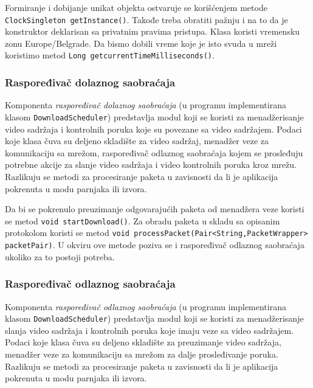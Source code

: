 \documentclass[12pt,oneside]{memoir}
\begin{document}
Formiranje i dobijanje unikat objekta ostvaruje se korišćenjem metode \\\texttt{ClockSingleton getInstance()}. 
Takođe treba obratiti pažnju i na to da je konstruktor deklarisan sa privatnim pravima pristupa. Klasa koristi vremensku zonu Europe/Belgrade. Da bismo dobili vreme koje je isto svuda u mreži koristimo metod \texttt{Long getcurrentTimeMilliseconds()}.


\subsubsection{Raspoređivač dolaznog saobraćaja}
\label{implementacija.2.3.5}

Komponenta \textit{raspoređivač dolaznog saobraćaja} (u programu implementirana klasom \texttt{DownloadScheduler}) predstavlja modul koji se koristi za menadžerisanje video sadržaja i kontrolnih poruka koje su povezane sa video sadržajem. Podaci koje klasa čuva su deljeno skladište za video sadržaj, menadžer veze za komunikaciju sa mrežom, raspoređivač odlaznog saobraćaja kojem se prosleđuju potrebne akcije za slanje video sadržaja i video kontrolnih poruka kroz mrežu. Razlikuju se metodi za procesiranje paketa u zavisnosti da li je aplikacija pokrenuta u modu parnjaka ili izvora.

Da bi se pokrenulo preuzimanje odgovarajućih paketa od menadžera veze koristi se metod \texttt{void startDownload()}. Za obradu paketa u skladu sa opisanim protokolom koristi se metod \texttt{void processPacket(Pair<String,PacketWrapper> packetPair)}. U okviru ove metode poziva se i raspoređivač odlaznog saobraćaja ukoliko za to postoji potreba.


\subsubsection{Raspoređivač odlaznog saobraćaja}
\label{implementacija.2.3.6}

Komponenta \textit{raspoređivač odlaznog saobraćaja} (u programu implementirana klasom \texttt{DownloadScheduler}) predstavlja modul koji se koristi za menadžerisanje slanja video sadržaja i kontrolnih poruka koje imaju veze sa video sadržajem. Podaci koje klasa čuva su deljeno skladište za preuzimanje video sadržaja, menadžer veze za komunikaciju sa mrežom za dalje prosleđivanje poruka. Razlikuju se metodi za procesiranje paketa u zavisnosti da li je aplikacija pokrenuta u modu parnjaka ili izvora.
\end{document}
